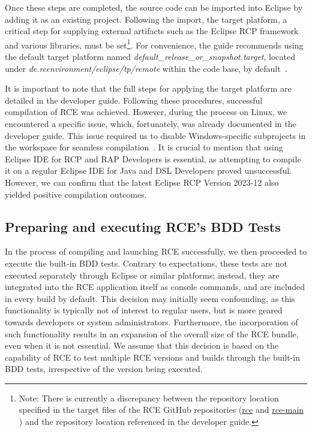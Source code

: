 Once these steps are completed, the source code can be imported into Eclipse by adding it as an existing project. Following the import, the target platform, a critical step for supplying external artifacts such as the Eclipse RCP framework and various libraries, must be set\footnote{Note: There is currently a discrepancy between the repository location specified in the target files of the RCE GitHub repositories (\href{https://github.com/rcenvironment/rce/blob/master/de.rcenvironment/eclipse/tp/remote/default_release_or_snapshot.target}{rce} and \href{https://github.com/rcenvironment/rce-main/blob/main/de.rcenvironment/eclipse/tp/remote/default_release_or_snapshot.target}{rce-main}
) and the repository location referenced in the developer guide.}. For convenience, the guide recommends using the default target platform named \textit{default\_release\_or\_snapshot.target}, located under \textit{de.rcenvironment/eclipse/tp/remote} within the code base, by default~\cite{rceDevGuide10x}.

It is important to note that the full steps for applying the target platform are detailed in the developer guide. Following these procedures, successful compilation of \ac{RCE} was achieved. However, during the process on Linux, we encountered a specific issue, which, fortunately, was already documented in the developer guide. This issue required us to disable Windows-specific subprojects in the workspace for seamless compilation~\cite{rceDevGuide10x}. It is crucial to mention that using Eclipse IDE for RCP and RAP Developers is essential, as attempting to compile it on a regular Eclipse IDE for Java and DSL Developers proved unsuccessful. However, we can confirm that the latest Eclipse RCP Version 2023-12 also yielded positive compilation outcomes.

\subsection{Preparing and executing \ac{RCE}'s BDD Tests}
\label{subsec:PreparingRCETests}
In the process of compiling and launching \ac{RCE} successfully, we then proceeded to execute the built-in BDD tests. Contrary to expectations, these tests are not executed separately through Eclipse or similar platforms; instead, they are integrated into the \ac{RCE} application itself as console commands, and are included in every build by default. This decision may initially seem confounding, as this functionality is typically not of interest to regular users, but is more geared towards developers or system administrators. Furthermore, the incorporation of such functionality results in an expansion of the overall size of the \ac{RCE} bundle, even when it is not essential. We assume that this decision is based on the capability of \ac{RCE} to test multiple \ac{RCE} versions and builds through the built-in BDD tests, irrespective of the version being executed.

